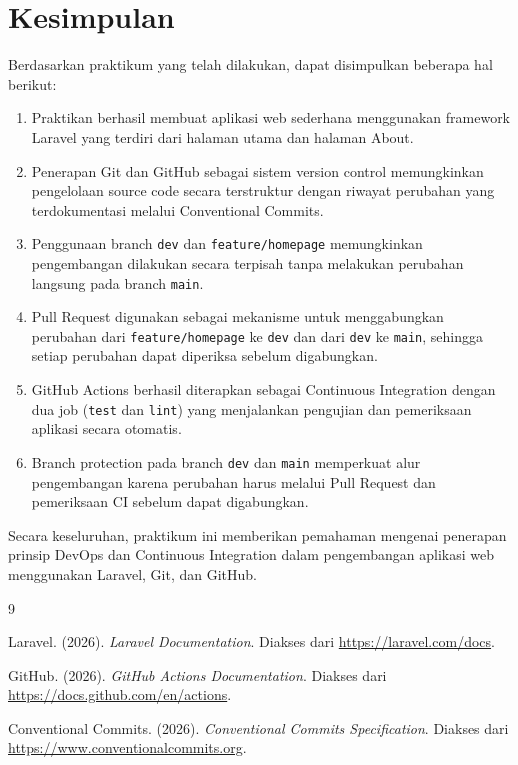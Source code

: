 \documentclass[a4paper,oneside,11pt]{book}
\begin{document}
\chapter{Kesimpulan}
Berdasarkan praktikum yang telah dilakukan, dapat disimpulkan beberapa hal berikut:
\begin{enumerate}
    \item Praktikan berhasil membuat aplikasi web sederhana menggunakan framework Laravel yang terdiri dari halaman utama dan halaman About.
    \item Penerapan Git dan GitHub sebagai sistem version control memungkinkan pengelolaan source code secara terstruktur dengan riwayat perubahan yang terdokumentasi melalui Conventional Commits.
    \item Penggunaan branch \texttt{dev} dan \texttt{feature/homepage} memungkinkan pengembangan dilakukan secara terpisah tanpa melakukan perubahan langsung pada branch \texttt{main}.
    \item Pull Request digunakan sebagai mekanisme untuk menggabungkan perubahan dari \texttt{feature/homepage} ke \texttt{dev} dan dari \texttt{dev} ke \texttt{main}, sehingga setiap perubahan dapat diperiksa sebelum digabungkan.
    \item GitHub Actions berhasil diterapkan sebagai Continuous Integration dengan dua job (\texttt{test} dan \texttt{lint}) yang menjalankan pengujian dan pemeriksaan aplikasi secara otomatis.
    \item Branch protection pada branch \texttt{dev} dan \texttt{main} memperkuat alur pengembangan karena perubahan harus melalui Pull Request dan pemeriksaan CI sebelum dapat digabungkan.
\end{enumerate}

Secara keseluruhan, praktikum ini memberikan pemahaman mengenai penerapan prinsip DevOps dan Continuous Integration dalam pengembangan aplikasi web menggunakan Laravel, Git, dan GitHub.

\clearpage

\begin{thebibliography}{9}

Laravel. (2026). \textit{Laravel Documentation}. Diakses dari \url{https://laravel.com/docs}.

GitHub. (2026). \textit{GitHub Actions Documentation}. Diakses dari \url{https://docs.github.com/en/actions}.

Conventional Commits. (2026). \textit{Conventional Commits Specification}. Diakses dari \url{https://www.conventionalcommits.org}.

\end{thebibliography}
\end{document}
